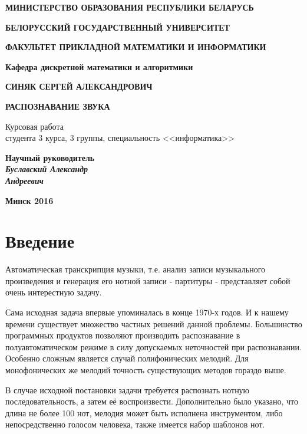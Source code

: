 \documentclass[oneside, final, 14pt]{extarticle}
\begin{document}
\begin{titlepage}


\centerline{\bf МИНИСТЕРСТВО ОБРАЗОВАНИЯ РЕСПУБЛИКИ БЕЛАРУСЬ}
\bigskip
\bigskip
\centerline{\bf БЕЛОРУССКИЙ ГОСУДАРСТВЕННЫЙ УНИВЕРСИТЕТ}
\bigskip
\bigskip
\centerline{\bf ФАКУЛЬТЕТ ПРИКЛАДНОЙ МАТЕМАТИКИ И ИНФОРМАТИКИ}
\bigskip
\bigskip
\centerline{\bf Кафедра дискретной математики и алгоритмики}
\vfill
\vfill
\vfill
\centerline{\bf СИНЯК СЕРГЕЙ АЛЕКСАНДРОВИЧ}
\bigskip
\bigskip
\centerline{\large \bf РАСПОЗНАВАНИЕ ЗВУКА}
\vfill
\begin{centering}
  {
  Курсовая работа \\
  студента 3 курса, 3 группы, специальность <<информатика>> \\}
\end{centering}
\vfill
\vfill
\hfill
\begin{minipage}{0.35\textwidth}
  {\bf Научный руководитель \\
  {\small{\it Буславский Александр \\ Андреевич}}}
\end{minipage}
\vfill
\vfill
\centerline{\large \bf Минск 2016}

\restoregeometry

\end{titlepage}

\setcounter{page}{2}

\tableofcontents
\cleardoublepage

\section{Введение}
  Автоматическая транскрипция музыки, т.е. анализ записи музыкального
  произведения и генерация его нотной записи - партитуры -
  представляет собой очень интерестную задачу.

  Сама исходная задача впервые упоминалась в конце 1970-х годов. И к нашему
  времени существует множество частных решений данной проблемы. Большинство
  программных продуктов позволяют производить распознавание в
  полуавтоматическом режиме в силу допускаемых неточностей при распознавании.
  Особенно сложным является случай полифонических мелодий.  Для
  монофонических же мелодий точность существующих методов гораздо выше.

  В случае исходной постановки задачи требуется распознать нотную
  последовательность, а затем её воспроизвести. Дополнительно было указано,
  что длина не более 100 нот, мелодия может быть исполнена инструментом, либо
  непосредственно голосом человека, также имеется набор шаблонов нот.
\end{document}
